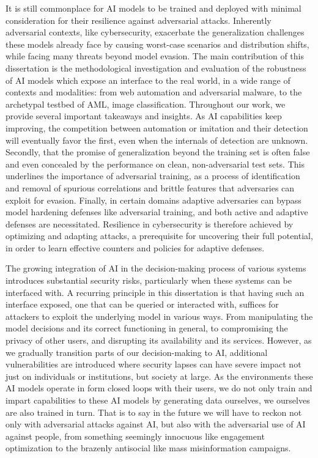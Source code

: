 It is still commonplace for \gls{AI} models to be trained and deployed with minimal consideration for their resilience against adversarial attacks.
Inherently adversarial contexts, like cybersecurity, exacerbate the generalization challenges these models already face by causing worst-case scenarios and distribution shifts, while facing many threats beyond model evasion.
The main contribution of this dissertation is the methodological investigation and evaluation of the robustness of AI models which expose an interface to the real world, in a wide range of contexts and modalities: from web automation and adversarial malware, to the archetypal testbed of \gls{AML}, image classification.
Throughout our work, we provide several important takeaways and insights.
As \gls{AI} capabilities keep improving, the competition between automation or imitation and their detection will eventually favor the first, even when the internals of detection are unknown.
Secondly, that the promise of generalization beyond the training set is often false and even concealed by the performance on clean, non-adversarial test sets.
This underlines the importance of adversarial training, as a process of identification and removal of spurious correlations and brittle features that adversaries can exploit for evasion.
Finally, in certain domains adaptive adversaries can bypass model hardening defenses like adversarial training, and both active and adaptive defenses are necessitated.
Resilience in cybersecurity is therefore achieved by optimizing and adapting attacks, a prerequisite for uncovering their full potential, in order to learn effective counters and policies for adaptive defenses.

The growing integration of \gls{AI} in the decision-making process of various systems introduces substantial security risks, particularly when these systems can be interfaced with.
A recurring principle in this dissertation is that having such an interface exposed, one that can be queried or interacted with, suffices for attackers to exploit the underlying model in various ways.
From manipulating the model decisions and its correct functioning in general, to compromising the privacy of other users, and disrupting its availability and its services.
However, as we gradually transition parts of our decision-making to AI, additional vulnerabilities are introduced where security lapses can have severe impact not just on individuals or institutions, but society at large. 
As the environments these AI models operate in form closed loops with their users, we do not only train and impart capabilities to these \gls{AI} models by generating data ourselves, we ourselves are also trained in turn.
That is to say in the future we will have to reckon not only with adversarial attacks against \gls{AI}, but also with the adversarial use of \gls{AI} against people, from something seemingly innocuous like engagement optimization to the brazenly antisocial like mass misinformation campaigns.

